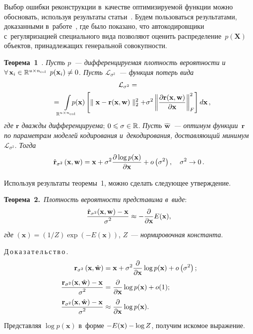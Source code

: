 \begin{multicols}{2}
Выбор ошибки реконструкции в~качестве оптимизируемой функции можно обосновать, 
используя результаты статьи~\cite{ae}. Будем пользоваться результатами, 
доказанными в~работе~\cite{ae}, где было показано, что автокодировщики 
с~регуляризацией специального вида позволяют оценить распределение~$p(\mathbf{X})$ 
объектов, принадлежащих генеральной совокупности.

\smallskip

\noindent
\textbf{Теорема~1}\ 
\cite{ae}. %
\textit{Пусть $p$~--- дифференцируемая плотность вероятности и~$\forall\, 
\mathbf{x}_i \hm\in \mathbb{R}^{u \times n_{\mathrm{col}}}$ $p(\mathbf{x}_i)\hm\neq 0$.  
Пусть $\mathcal{L}_{\sigma^2}$~--- функция потерь вида}
\begin{multline*}
\mathcal{L}_{\sigma^2} ={}\\
{}=\!\!\!\int\limits_{\mathbb{R}^{u \times n_{\mathrm{col}}}} \!\!\!\!\!\!
p(\mathbf{x}) \left[
\parallel \mathbf{x} - \mathbf{r}(\mathbf{x}, \mathbf{w}) 
\parallel^2_2 + \sigma^2  \left\| \fr{\partial \mathbf{r}(\mathbf{x}, 
\mathbf{w})}{\partial \mathbf{x}} \right\|_{F}^2\right] d\mathbf{x}\,,\hspace*{-7.12155pt}
\end{multline*}
\textit{где $\mathbf{r}$ дважды дифференцируема}; $0 \hm\leqslant \sigma \hm\in \mathbb{R}$. 
\textit{Пусть $\hat{\mathbf{w}}$~--- оптимум функции~$\mathbf{r}$ по параметрам моделей 
кодирования и~декодирования, доставляющий минимум~$\mathcal{L}_{\sigma^2}$. 
Тогда}
$$
\hat{\mathbf{r}}_{\sigma^2}\left(\mathbf{x}, \mathbf{w}\right) = \mathbf{x} + \sigma^2 
\displaystyle\frac{\displaystyle \partial \log p(\mathbf{x})\mathstrut}{\displaystyle \partial \mathbf{x}\mathstrut} + o\left(\sigma^2\right), \quad 
\sigma^2 \rightarrow 0\,.
$$


Используя результаты теоремы~1, можно сделать следующее утверждение.

\smallskip

\noindent
\textbf{Теорема~2.}\ 
\textit{Плотность вероятности представима в~виде}:
$$
\displaystyle\frac{\displaystyle \hat{\mathbf{r}}_{\sigma^2}(\mathbf{x}, \mathbf{w}) - 
\mathbf{x}\mathstrut}{\displaystyle \sigma^2\mathstrut} \approx -\displaystyle\frac{\displaystyle \partial\mathstrut}{\displaystyle \partial 
\mathbf{x}\mathstrut}E(\mathbf{x}),
$$ 
\textit{где} 
$(\mathbf{x}) = ({1}/{Z})\exp(-
E(\mathbf{x}))$, $Z$~--- \textit{нормировочная константа}.

\smallskip

\noindent
Д\,о\,к\,а\,з\,а\,т\,е\,л\,ь\,с\,т\,в\,о\,.
\begin{align*}
{\mathbf{r}}_{\sigma^2}\left(\mathbf{x}, \hat{\mathbf{w}}\right) &= \mathbf{x} + \sigma^2 
\displaystyle\frac{\displaystyle \partial\mathstrut}{\displaystyle \partial \mathbf{x}\mathstrut}\log p(\mathbf{x}) + o\left(\sigma^2\right);
\\
\displaystyle\frac{\displaystyle {\mathbf{r}}_{\sigma^2}(\mathbf{x}, \hat{\mathbf{w}}) - 
\mathbf{x}\mathstrut}{\displaystyle \sigma^2\mathstrut} &= \displaystyle\frac{\displaystyle \partial\mathstrut}{\displaystyle \partial \mathbf{x}\mathstrut}\log p(\mathbf{x}) + o(1);
\\
\displaystyle\frac{\displaystyle {\mathbf{r}}_{\sigma^2}(\mathbf{x}, \hat{\mathbf{w}}) - 
\mathbf{x}\mathstrut}{\displaystyle \sigma^2\mathstrut} &\approx \displaystyle\frac{\displaystyle \partial\mathstrut}{\displaystyle \partial \mathbf{x}\mathstrut}\log 
p(\mathbf{x}).
\end{align*}
Представляя $\log p(\mathbf{x})$ в~форме $-E(\mathbf{x}) \hm- \log Z$, получим 
искомое выражение.


\end{multicols}
